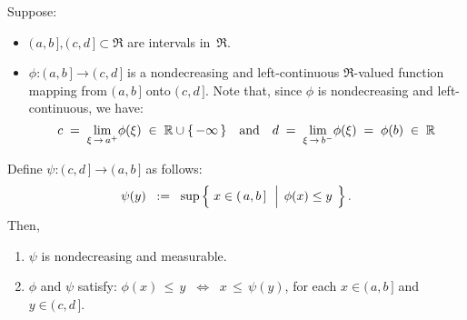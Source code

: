
\begin{lemma}\label{lemma:nondecreasingLeftContinuous}
\mbox{}\vskip 0.1cm
\noindent
Suppose:
\begin{itemize}
\item
	$(\,a,b\,], (\,c,d\,] \subset \Re$ are intervals in \,$\Re$.
\item
	$\phi : (\,a,b\,] \longrightarrow (\,c,d\,]$ is a nondecreasing and left-continuous
	$\Re$-valued function mapping from $(\,a,b\,]$ {\color{red}onto} $(\,c,d\,]$.
	Note that, since $\phi$ is nondecreasing and left-continuous, we have:
	\begin{equation*}
	c \; = \; \underset{\xi\,\rightarrow\,a^{+}}{\lim}\phi(\xi) \; \in \; \Re\cup\{\,-\infty\,\}
	\quad\textnormal{and}\quad
	d \; = \; \underset{\xi\,\rightarrow\,b^{-}}{\lim}\phi(\xi) \; = \; \phi(b) \; \in \; \Re
	\end{equation*}
\end{itemize}
Define \;$\psi : (\,c,d\,] \longrightarrow (\,a,b\,]$\; as follows:
\begin{equation*}
\psi(y)
\;\; := \;\;
	\sup\left\{\;
		x \in (\,a,b\,]
	\,\;\left\vert\;\,
		\overset{{\color{white}.}}{\phi}(x) \leq y
	\right.
	\;\right\}.
\end{equation*}
Then,
\begin{enumerate}
\item
	$\psi$ is nondecreasing and measurable.
\item
	$\phi$ and $\psi$ satisfy:\quad
	$\phi(x) \,\leq\, y \;\; \Longleftrightarrow \;\; x \,\leq\, \psi(y)$,\;\;
	for each \;$x \in (\,a,b\,]$\; and \;$y \in (\,c,d\,]$.
\end{enumerate}
\end{lemma}
\proof
